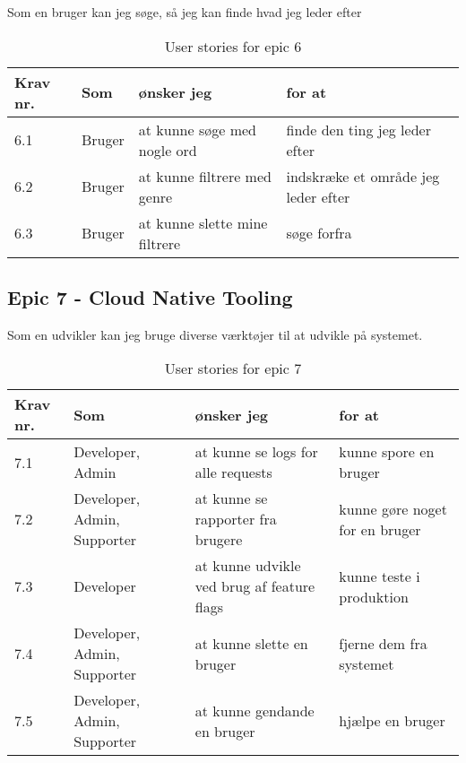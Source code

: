 Som en bruger kan jeg søge, så jeg kan finde hvad jeg leder efter

\begin{table}[H]
    \centering
    \caption{User stories for epic 6}
    \label{tab:us-epic6}
    \begin{tabular}{l|l|l|l}
        \textbf{Krav nr.} & \textbf{Som} & \textbf{ønsker jeg}           & \textbf{for at}                     \\
        \hline
        6.1               & Bruger       & at kunne søge med nogle ord   & finde den ting jeg leder efter      \\
        \hline
        6.2               & Bruger       & at kunne filtrere med genre   & indskræke et område jeg leder efter \\
        \hline
        6.3               & Bruger       & at kunne slette mine filtrere & søge forfra                         \\
    \end{tabular}
\end{table}

\subsection{Epic 7 - Cloud Native Tooling}

Som en udvikler kan jeg bruge diverse værktøjer til at udvikle på systemet.

\begin{table}[H]
    \centering
    \caption{User stories for epic 7}
    \label{tab:us-epic7}
    \begin{tabular}{l|l|l|l}
        \textbf{Krav nr.} & \textbf{Som}                & \textbf{ønsker jeg}                        & \textbf{for at}                \\\hline
        7.1               & Developer, Admin            & at kunne se logs for alle requests         & kunne spore en bruger          \\\hline
        7.2               & Developer, Admin, Supporter & at kunne se rapporter fra brugere          & kunne gøre noget for en bruger \\\hline
        7.3               & Developer                   & at kunne udvikle ved brug af feature flags & kunne teste i produktion       \\\hline
        7.4               & Developer, Admin, Supporter & at kunne slette en bruger                  & fjerne dem fra systemet        \\\hline
        7.5               & Developer, Admin, Supporter & at kunne gendande en bruger                & hjælpe en bruger               \\
    \end{tabular}
\end{table}
